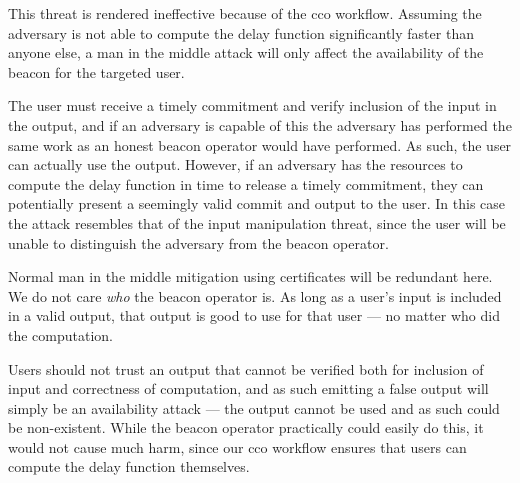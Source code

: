 This threat is rendered ineffective because of the \gls{cco} workflow.
Assuming the adversary is not able to compute the delay function significantly faster than anyone else, a man in the middle attack will only affect the availability of the beacon for the targeted user.

The user must receive a timely commitment and verify inclusion of the input in the output, and if an adversary is capable of this the adversary has performed the same work as an honest beacon operator would have performed.
As such, the user can actually use the output.
However, if an adversary has the resources to compute the delay function in time to release a timely commitment, they can potentially present a seemingly valid commit and output to the user.
In this case the attack resembles that of the input manipulation threat, since the user will be unable to distinguish the adversary from the beacon operator.

Normal man in the middle mitigation using certificates will be redundant here.
We do not care \emph{who} the beacon operator is.
As long as a user's input is included in a valid output, that output is good to use for that user --- no matter who did the computation.

Users should not trust an output that cannot be verified both for inclusion of input and correctness of computation, and as such emitting a false output will simply be an availability attack --- the output cannot be used and as such could be non-existent.
While the beacon operator practically could easily do this, it would not cause much harm, since our \gls{cco} workflow ensures that users can compute the delay function themselves.



